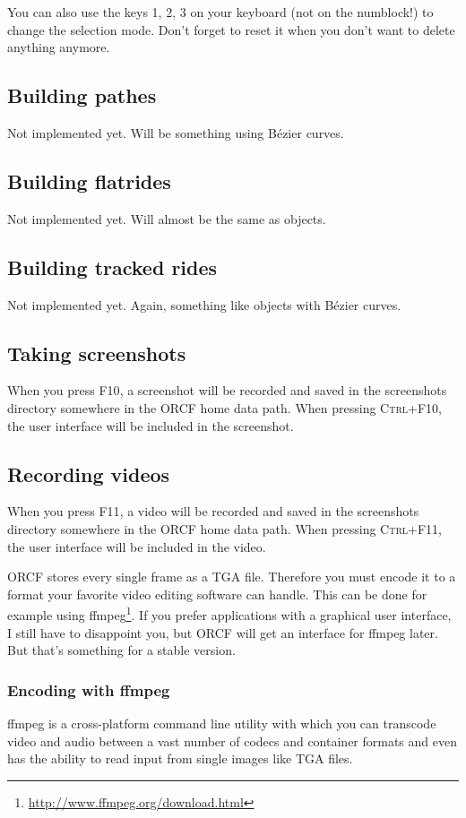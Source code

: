 \documentclass[a4paper]{article}
\newcommand{\ccaption}[1]{\textsc{#1}}
\begin{document}
You can also use the keys \ccaption{1}, \ccaption{2}, \ccaption{3} on your keyboard (not on the numblock!) to change the selection mode. Don't
forget to reset it when you don't want to delete anything anymore.

\subsection{Building pathes}
Not implemented yet. Will be something using Bézier curves.

\subsection{Building flatrides}
Not implemented yet. Will almost be the same as objects.

\subsection{Building tracked rides}
Not implemented yet. Again, something like objects with Bézier curves.

\subsection{Taking screenshots}
When you press \ccaption{F10}, a screenshot will be recorded and saved in the screenshots directory somewhere in the ORCF home data path.
When pressing \ccaption{Ctrl+F10}, the user interface will be included in the screenshot.

\subsection{Recording videos}
When you press \ccaption{F11}, a video will be recorded and saved in the screenshots directory somewhere in the ORCF home data path.
When pressing \ccaption{Ctrl+F11}, the user interface will be included in the video.

ORCF stores every single frame as a TGA file. Therefore you must encode it to a format your favorite video editing software can handle. This
can be done for example using ffmpeg\footnote{\url{http://www.ffmpeg.org/download.html}}. If you prefer applications with a graphical user
interface, I still have to disappoint you, but ORCF will get an interface for ffmpeg later. But that's something for a stable version.

\subsubsection{Encoding with ffmpeg}
ffmpeg is a cross-platform command line utility with which you can transcode video and audio between a vast number of codecs and container
formats and even has the ability to read input from single images like TGA files.
\end{document}
